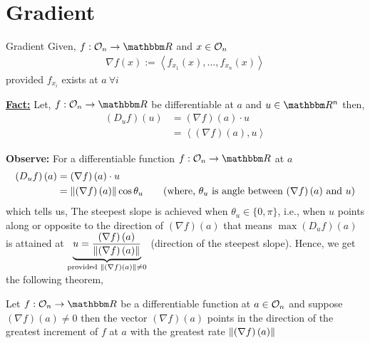 \documentclass[../Analysis-3]{subfiles}
\begin{document}
\section{Gradient}

\begin{Def}{Gradient}{}
  Given, $ f:\Op{n}\to\R $ and $ x\in\mathcal{O}_{n} $
  \begin{align*}
    \nabla f(x) := \left\langle f_{x_1}(x), \ldots, f_{x_n}(x) \right\rangle
  \end{align*}
  provided $ f_{x_i} $ exists at $ a \ \forall i $
\end{Def}

\textbf{\underline{Fact:}} Let, $ f:\Op{n}\to\R $ be differentiable at $ a $ and $ u\in\R^n $ then,
\begin{align*}
  \left( D_uf \right)(u) & = \left( \nabla f\right)\left( a \right)\cdot u \\ &= \left\langle \left( \nabla f \right)\left( a \right), u \right\rangle
\end{align*}

\textbf{Observe:} For a differentiable function $ f: \Op{n} \to \R $ at $ a $
\begin{align*}
  \left( D_uf \right)\left( a \right) & = \left( \nabla f\right)\left( a \right)\cdot u                                                                                                         \\
                                      & = \norm{\left( \nabla f\right)\left( a \right)}\cos{\theta_u} \tag{where, $\theta_u$ is angle between $\left( \nabla f\right)\left( a \right)$ and $u$}
\end{align*}
which tells us, The steepest slope is achieved when $ \theta_u \in \{0, \pi\} $, i.e., when $ u $ points along or opposite to the direction of $ \left( \nabla f\right)\left( a \right) $
that means $ \max \left( D_uf \right)\left( a \right) $ is attained at $ \underbrace{u = \frac{\left( \nabla f\right)\left( a \right)}{\norm{\left( \nabla f\right)\left( a \right)}}}_{\text{provided } \norm{\left( \nabla f\right)\left( a \right)} \not=0 } $ (direction of the steepest slope).
Hence, we get the following theorem,
\begin{Thm}{}{}
  Let $ f: \Op{n} \to \R $ be a differentiable function at $ a \in \mathcal{O}_{n} $ and suppose $ \left( \nabla f\right)\left( a \right) \not= 0 $ then the vector $\left( \nabla f\right)\left( a \right)$ points in the direction of the greatest increment of $ f $ at $ a $ with the greatest rate $ \norm{\left( \nabla f\right)\left( a \right)} $
\end{Thm}
\end{document}
